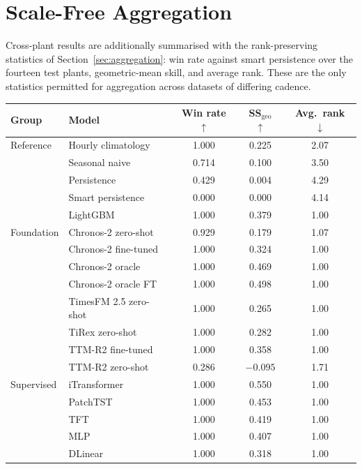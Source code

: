 \chapter{Scale-Free Aggregation}
\label{app:aggregation}

Cross-plant results are additionally summarised with the rank-preserving statistics of
Section~\ref{sec:aggregation}: win rate against smart persistence over the fourteen test
plants, geometric-mean skill, and average rank. These are the only statistics permitted for
aggregation across datasets of differing cadence.

\begin{table}[h!]
\centering
\small
\begin{tabular}{l l c c c}
\hline
\textbf{Group} & \textbf{Model} & \textbf{Win rate} $\uparrow$ &
\textbf{SS$_{\text{geo}}$} $\uparrow$ & \textbf{Avg.\ rank} $\downarrow$ \\
\hline
Reference & Hourly climatology & 1.000 & 0.225 & 2.07 \\
          & Seasonal naive & 0.714 & 0.100 & 3.50 \\
          & Persistence & 0.429 & 0.004 & 4.29 \\
          & Smart persistence & 0.000 & 0.000 & 4.14 \\
          & LightGBM & 1.000 & 0.379 & 1.00 \\
\hline
Foundation & Chronos-2 zero-shot & 0.929 & 0.179 & 1.07 \\
           & Chronos-2 fine-tuned & 1.000 & 0.324 & 1.00 \\
           & Chronos-2 oracle & 1.000 & 0.469 & 1.00 \\
           & Chronos-2 oracle FT & 1.000 & 0.498 & 1.00 \\
           & TimesFM 2.5 zero-shot & 1.000 & 0.265 & 1.00 \\
           & TiRex zero-shot & 1.000 & 0.282 & 1.00 \\
           & TTM-R2 fine-tuned & 1.000 & 0.358 & 1.00 \\
           & TTM-R2 zero-shot & 0.286 & $-0.095$ & 1.71 \\
\hline
Supervised & iTransformer & 1.000 & 0.550 & 1.00 \\
           & PatchTST & 1.000 & 0.453 & 1.00 \\
           & TFT & 1.000 & 0.419 & 1.00 \\
           & MLP & 1.000 & 0.407 & 1.00 \\
           & DLinear & 1.000 & 0.318 & 1.00 \\

\end{tabular}
\end{table}
